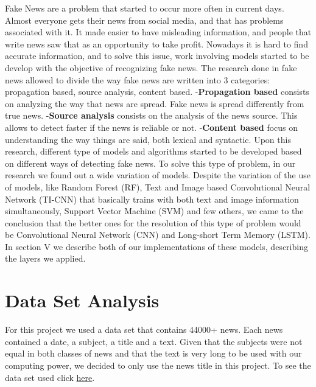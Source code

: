 \documentclass[conference]{IEEEtran}
\newcommand\tab[1][0.4cm]{\hspace*{#1}}
\begin{document}
Fake News are a problem that started to occur more often in current days. Almost everyone gets their news from social media, and that has problems associated with it. It made easier to have misleading information, and people that write news saw that as an opportunity to take profit. Nowadays it is hard to find accurate information, and to solve this issue, work involving models started to be develop with the objective of recognizing fake news. 
\linebreak
\tab The research done in fake news allowed to divide the way fake news are written into 3 categories: propagation based, source analysis, content based.
\linebreak
-\textbf{Propagation based} consists on analyzing the way that news are spread. Fake news is spread differently from true news.
\linebreak
-\textbf{Source analysis} consists on the analysis of the news source. This allows to detect faster if the news is reliable or not.
\linebreak
-\textbf{Content based} focus on understanding the way things are said, both lexical and syntactic. 
\linebreak
\tab Upon this research, different type of models and algorithms started to be developed based on different ways of detecting fake news.
\linebreak
To solve this type of problem, in our research we found out a wide variation of models. Despite the variation of the use of models, like Random Forest (RF), Text and Image based Convolutional Neural Network (TI-CNN) that basically trains with both text and image information simultaneously, Support Vector Machine (SVM) and few others, we came to the conclusion that the better ones for the resolution of this type of problem would be Convolutional Neural Network (CNN) and Long-short Term Memory (LSTM). In section V we describe both of our implementations of these models, describing the layers we applied.



\section{Data Set Analysis}
For this project we used a data set that contains 44000+ news. Each news contained a date, a subject, a title and a text. Given that the subjects were not equal in both classes of news and that the text is very long to be used with our computing power, we decided to only use the news title in this project. To see the data set used click  \href{https://www.kaggle.com/clmentbisaillon/fake-and-real-news-dataset}{here}.
\end{document}
